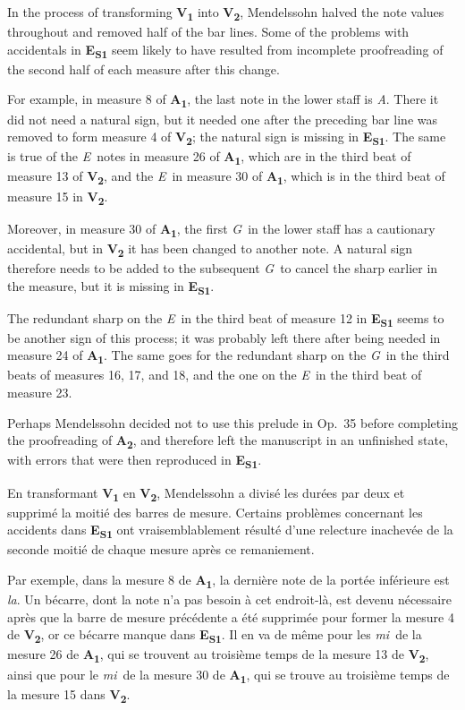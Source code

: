 \documentclass[a4paper, 12pt]{book}
\newcommand{\source}[2]{\textbf{#1\textsubscript{#2}}}
\newcommand{\bigdot}[0]{{\Large \textbullet}}
\newcommand{\centerbigdot}[0]{\begin{center}\bigdot\end{center}}
\begin{document}
{    In the process of transforming \source{V}{1} into \source{V}{2},
    Mendelssohn halved the note values throughout and removed half of
    the bar lines. Some of the problems with accidentals in
    \source{E}{S1} seem likely to have resulted from incomplete
    proofreading of the second half of each measure after this change.

    For example, in measure 8 of \source{A}{1}, the last note in the
    lower staff is \textit{A}\na. There it did not need a natural
    sign, but it needed one after the preceding bar line was removed
    to form measure 4 of \source{V}{2}; the natural sign is missing in
    \source{E}{S1}. The same is true of the \textit{E}\na\ notes in
    measure 26 of \source{A}{1}, which are in the third beat of
    measure 13 of \source{V}{2}, and the \textit{E}\na\ in measure 30
    of \source{A}{1}, which is in the third beat of measure 15 in
    \source{V}{2}.
    
    Moreover, in measure 30 of \source{A}{1}, the first
    \textit{G}\na\ in the lower staff has a cautionary accidental, but
    in \source{V}{2} it has been changed to another note. A natural
    sign therefore needs to be added to the subsequent
    \textit{G}\na\ to cancel the sharp earlier in the measure, but it
    is missing in \source{E}{S1}.

    The redundant sharp on the \textit{E}\sh\ in the third beat of
    measure 12 in \source{E}{S1} seems to be another sign of this
    process; it was probably left there after being needed in measure
    24 of \source{A}{1}. The same goes for the redundant sharp on the
    \textit{G}\sh\ in the third beats of measures 16, 17, and 18, and
    the one on the \textit{E}\sh\ in the third beat of measure 23.

    Perhaps Mendelssohn decided not to use this prelude in Op.\ 35
    before completing the proofreading of \source{A}{2}, and therefore
    left the manuscript in an unfinished state, with errors that were
    then reproduced in \source{E}{S1}.

    \centerbigdot

    En transformant \source{V}{1} en \source{V}{2}, Mendelssohn a
    divisé les durées par deux et supprimé la moitié des barres de
    mesure. Certains problèmes concernant les accidents dans
    \source{E}{S1} ont vraisemblablement résulté d'une relecture
    inachevée de la seconde moitié de chaque mesure après ce
    remaniement.

    Par exemple, dans la mesure 8 de \source{A}{1}, la dernière note
    de la portée inférieure est \textit{la}\na. Un bécarre, dont la
    note n'a pas besoin à cet endroit-là, est devenu nécessaire après
    que la barre de mesure précédente a été supprimée pour former la
    mesure 4 de \source{V}{2}, or ce bécarre manque dans
    \source{E}{S1}. Il en va de même pour les \textit{mi}\na\ de la
    mesure 26 de \source{A}{1}, qui se trouvent au troisième temps de
    la mesure 13 de \source{V}{2}, ainsi que pour le \textit{mi}\na\ de la
    mesure 30 de \source{A}{1}, qui se trouve au troisième temps de la
    mesure 15 dans \source{V}{2}.

}
\end{document}
